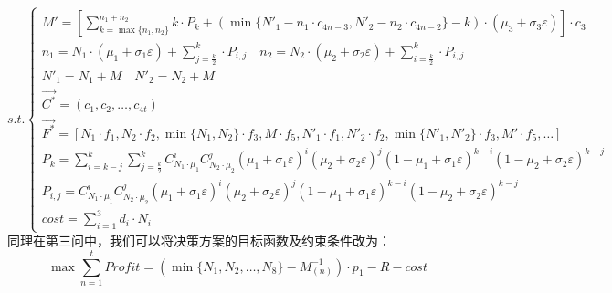 \documentclass[withoutpreface,bwprint]{cumcmthesis} %
\begin{document}
\begin{equation*}
	s.t.\begin{cases}
		M'=[\sum_{k=\max \{n_{1},n_{2}\}}^{n_{1}+n_{2}}k\cdot P_{k}+(\min \{N'_{1}-n_{1}\cdot c_{4n-3},N'_{2}-n_{2}\cdot c_{4n-2}\}-k)\cdot (\mu_{3}+\sigma_{3}\varepsilon )]\cdot c_{3}                                                                     \\
		n_{1}=N_{1}\cdot (\mu_{1}+\sigma_{1}\varepsilon )+\sum_{j=\frac{k}{2}}^{k}\cdot P_{i,j} \quad n_{2}=N_{2}\cdot (\mu_{2}+\sigma_{2}\varepsilon )+\sum_{i=\frac{k}{2}}^{k}\cdot P_{i,j}                                                                \\
		N'_{1}=N_{1}+M \quad N'_{2}=N_{2}+M                                                                                                                                                                                                                  \\
		\vec{C^{*}}=(c_{1},c_{2},\dots,c_{4t})                                                                                                                                                                                                               \\
		\vec{F^{*}}=[N_{1}\cdot f_{1},N_{2}\cdot f_{2},\min \{N_{1},N_{2}\}\cdot f_{3},M\cdot f_{5},N'_{1}\cdot f_{1},N'_{2}\cdot f_{2},\min \{N'_{1},N'_{2}\}\cdot f_{3},M'\cdot f_{5},\dots]                                                               \\
		P_{k}=\sum_{i=k-j}^{k}\sum_{j=\frac{k}{2}}^{k}C_{N_{1}\cdot\mu_{1}}^{i}C_{N_{2}\cdot\mu_{2}}^{j}(\mu_{1}+\sigma_{1}\varepsilon)^{i}(\mu_{2}+\sigma_{2}\varepsilon)^{j}(1-\mu_{1}+\sigma_{1}\varepsilon)^{k-i}(1-\mu_{2}+\sigma_{2}\varepsilon)^{k-j} \\
		P_{i,j}=C_{N_{1}\cdot\mu_{1}}^{i}C_{N_{2}\cdot\mu_{2}}^{j}(\mu_{1}+\sigma_{1}\varepsilon)^{i}(\mu_{2}+\sigma_{2}\varepsilon)^{j}(1-\mu_{1}+\sigma_{1}\varepsilon)^{k-i}(1-\mu_{2}+\sigma_{2}\varepsilon)^{k-j}                                       \\
		cost = \sum_{i=1}^{3}d_{i}\cdot N_{i}
	\end{cases}
\end{equation*}
同理在第三问中，我们可以将决策方案的目标函数及约束条件改为：
$$\max	\sum_{n=1}^{t}\textit{Profit}=(\min \{N_{1},N_{2},\dots,N_{8}\}-M_{(n)}^{-1})\cdot p_{1}-R -cost$$
\end{document}
